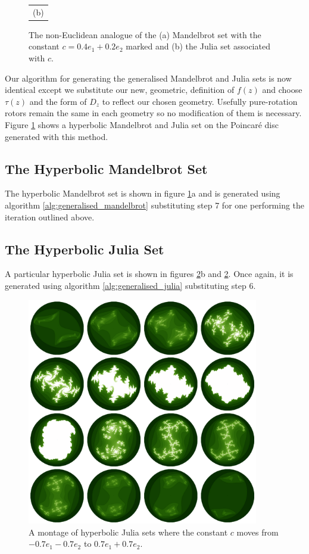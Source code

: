 \begin{figure}[p]
\begin{tabular}{c}
                          (b)
\end{tabular}
\caption{\label{fig:noneuclidean_sets}The non-Euclidean analogue of the (a) Mandelbrot set with
  the constant $c = 0.4e_1 + 0.2e_2$ marked and (b) the Julia
  set associated with $c$.}
\end{figure}

Our algorithm for generating the generalised Mandelbrot and Julia sets is now identical
except we substitute our new, geometric, definition of $f(z)$ and choose $\tau(z)$
and the form of $D_z$ to reflect our chosen geometry. Usefully pure-rotation rotors remain
the same in each geometry so no modification of them is necessary. Figure
\ref{fig:noneuclidean_sets} shows a hyperbolic Mandelbrot and Julia set on the
Poincar\'e disc generated with this method. 

\subsection{The Hyperbolic Mandelbrot Set}

The hyperbolic Mandelbrot set is shown in figure \ref{fig:noneuclidean_sets}a and
is generated using algorithm \ref{alg:generalised_mandelbrot} substituting
step 7 for one performing the iteration outlined above. 

\subsection{The Hyperbolic Julia Set}

A particular hyperbolic Julia set is shown in figures \ref{fig:julia_montage}b
and \ref{fig:julia_montage}.  Once again, it is generated using algorithm
\ref{alg:generalised_julia} substituting step 6.

\begin{figure}[p]
\centering
\includegraphics[width=0.9\textwidth]{julia_montage}
\caption{\label{fig:julia_montage} 
  A montage of hyperbolic Julia sets where the constant $c$ moves from $-0.7e_1 - 0.7e_2$
  to $0.7e_1 + 0.7e_2$.
}
\end{figure}


